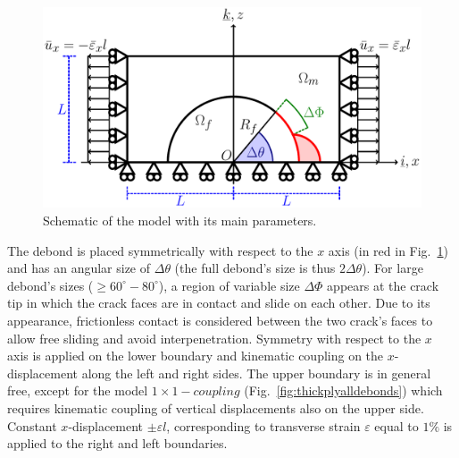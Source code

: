 \documentclass[review]{elsarticle}
\begin{document}
\begin{figure}[!h]
\centering
        \includegraphics[width=\textwidth]{RUC.pdf}

\caption{Schematic of the model with its main parameters.}\label{subfig:modelschem}
\end{figure}

The debond is placed symmetrically with respect to the $x$ axis (in red in Fig.~\ref{subfig:modelschem}) and has an angular size of $\Delta\theta$ (the full debond's size is thus $2\Delta\theta$). For large debond's sizes ($\geq 60^{\circ}-80^{\circ}$), a region of variable size $\Delta\Phi$ appears at the crack tip in which the crack faces are in contact and slide on each other. Due to its appearance, frictionless contact is considered between the two crack's faces to allow free sliding and avoid interpenetration. Symmetry with respect to the $x$ axis is applied on the lower boundary and kinematic coupling on the $x$-displacement along the left and right sides. The upper boundary is in general free, except for the model $1\times 1-coupling$ (Fig.~\ref{fig:thickplyalldebonds}) which requires kinematic coupling of vertical displacements also on the upper side. Constant $x$-displacement $\pm\varepsilon l$, corresponding to transverse strain $\varepsilon$ equal to $1\%$ is applied to the right and left boundaries.
\end{document}
